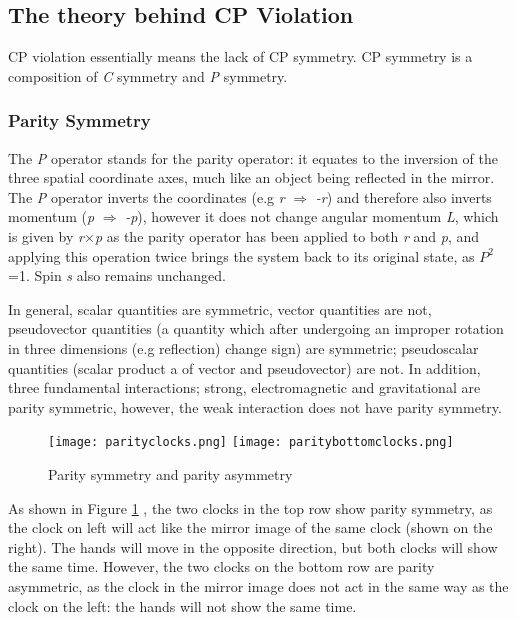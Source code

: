 \documentclass[11pt,oneside,a4paper]{article}
\begin{document}
\subsection{The theory behind CP Violation}
CP violation essentially means the lack of CP symmetry. CP symmetry is a composition of \textit{C} symmetry and \textit{P} symmetry.

\subsubsection{Parity Symmetry}

The \textit{P} operator stands for the parity operator: it equates to the inversion of the three spatial coordinate axes, much like an object being reflected in the mirror. The \textit{P} operator inverts the coordinates (e.g \textit{r} $\Rightarrow$ \textit{-r}) and therefore also inverts momentum (\textit{p} $\Rightarrow$ \textit{-p}), however it does not change angular momentum \textit{L}, which is given by \textit{r$\times$p} as the parity operator has been applied to both \textit{r} and \textit{p}, and applying this operation twice brings the system back to its original state, as \textit{$P^2$}=1. Spin \textit{s} also remains unchanged.
 
In general, scalar quantities are symmetric, vector quantities are not, pseudovector quantities (a quantity which after undergoing an improper rotation in three dimensions (e.g reflection) change sign) are symmetric;  pseudoscalar quantities (scalar product a of vector and pseudovector) are not. In addition, three fundamental interactions; strong, electromagnetic and gravitational are parity symmetric, however, the weak interaction does not have parity symmetry.


\begin{figure}[htbp]
	\centering
	\texttt{[image: parityclocks.png]}
	\texttt{[image: paritybottomclocks.png]}
	\caption{Parity symmetry and parity asymmetry}
	\label{fig:parityclocks1}
\end{figure}

As shown in Figure \ref{fig:parityclocks1} , the two clocks in the top row show parity symmetry, as the clock on left will act like the mirror image of the same clock (shown on the right). The hands will move in the opposite direction, but both clocks will show the same time. However, the two clocks on the bottom row are parity asymmetric, as the clock in the mirror image does not act in the same way as the clock on the left: the hands will not show the same time.
\end{document}

